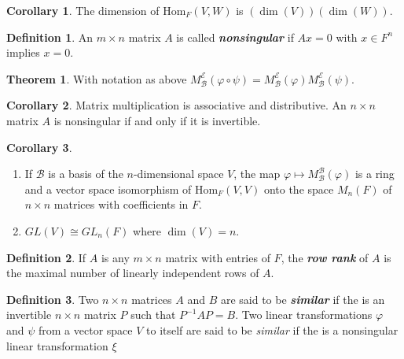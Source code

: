 \documentclass[10pt]{article}
\theoremstyle{definition}
\newtheorem{thm}{Theorem}[section]
\newtheorem*{cor}{Corollary}
\newtheorem*{defn}{Definition}
\newcommand{\nl}{\vspace{7em}}
\newcommand{\inv}{^{-1}}
\newcommand{\vphi}{\varphi}
\newcommand{\Hom}{\text{Hom}}
\newcommand{\BB}{\mathcal{B}}
\newcommand{\EE}{\mathcal{E}}
\begin{document}
\nl

\begin{cor}
The dimension of $\Hom_F(V,W)$ is $(\dim(V))(\dim(W))$.
\end{cor}

\nl

\begin{defn}
An $m\times n$ matrix $A$ is called \textit{\textbf{nonsingular}} if $Ax = 0$ with $x\in F^n$ implies $x = 0$.
\end{defn}

\nl

\begin{thm}
With notation as above $M_\BB^\EE(\vphi\circ \psi) = M_\BB^\EE(\vphi) M_\BB^\EE(\psi)$.
\end{thm}

\nl

\begin{cor}
Matrix multiplication is associative and distributive. An $n\times n$ matrix $A$ is nonsingular if and only if it is invertible.
\end{cor}

\nl

\begin{cor}\nl
\begin{enumerate}
\item If $\BB$ is a basis of the $n$-dimensional space $V$, the map $\vphi\mapsto M_\BB^\BB(\vphi)$ is a ring and a vector space isomorphism of $\Hom_F(V,V)$ onto the space $M_n(F)$ of $n\times n$ matrices with coefficients in $F$.
\item $GL(V)\cong GL_n(F)$ where $\dim(V) = n$. 
\end{enumerate}
\end{cor}

\nl

\begin{defn}
If $A$ is any $m\times n$ matrix with entries of $F$, the \textit{\textbf{row rank}} of $A$ is the maximal number of linearly independent rows of $A$.
\end{defn}

\nl

\begin{defn}
Two $n\times n$ matrices $A$ and $B$ are said to be \textit{\textbf{similar}} if the is an invertible $n\times n$ matrix $P$ such that $P\inv A P = B$. Two linear transformations $\vphi$ and $\psi$ from a vector space $V$ to itself are said to be \textit{similar} if the is a nonsingular linear transformation $\xi$
\end{defn}
\end{document}
